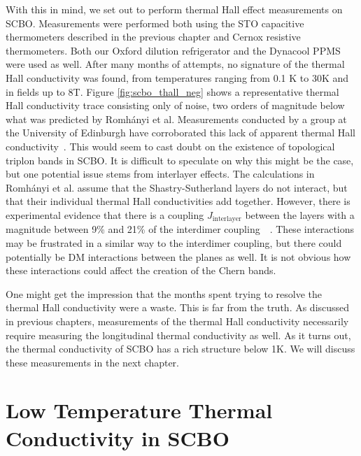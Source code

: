 \documentclass{thesis-umich}
\begin{document}
With this in mind, we set out to perform thermal Hall effect measurements on SCBO. Measurements were performed both using the STO capacitive thermometers described in the previous chapter and Cernox resistive thermometers. Both our Oxford dilution refrigerator and the Dynacool PPMS were used as well. After many months of attempts, no signature of the thermal Hall conductivity was found, from temperatures ranging from 0.1 K to 30K and in fields up to 8T. Figure \ref{fig:scbo_thall_neg} shows a representative thermal Hall conductivity trace consisting only of noise, two orders of magnitude below what was predicted by Romh\'{a}nyi et al. Measurements conducted by a group at the University of Edinburgh have corroborated this lack of apparent thermal Hall conductivity~\cite{CairnsMarchMeeting}. This would seem to cast doubt on the existence of topological triplon bands in SCBO. It is difficult to speculate on why this might be the case, but one potential issue stems from interlayer effects. The calculations in Romh\'{a}nyi et al. assume that the Shastry-Sutherland layers do not interact, but that their individual thermal Hall conductivities add together. However, there is experimental evidence that there is a coupling $J_{\mathrm{interlayer}}$ between the layers with a magnitude between 9\% and 21\% of the interdimer coupling~\cite{Miyahara2000}~\cite{Knetter2000}. These interactions may be frustrated in a similar way to the interdimer coupling, but there could potentially be DM interactions between the planes as well. It is not obvious how these interactions could affect the creation of the Chern bands.

One might get the impression that the months spent trying to resolve the thermal Hall conductivity were a waste. This is far from the truth. As discussed in previous chapters, measurements of the thermal Hall conductivity necessarily require measuring the longitudinal thermal conductivity as well. As it turns out, the thermal conductivity of SCBO has a rich structure below 1K. We will discuss these measurements in the next chapter.

\section{Low Temperature Thermal Conductivity in SCBO}
\end{document}
